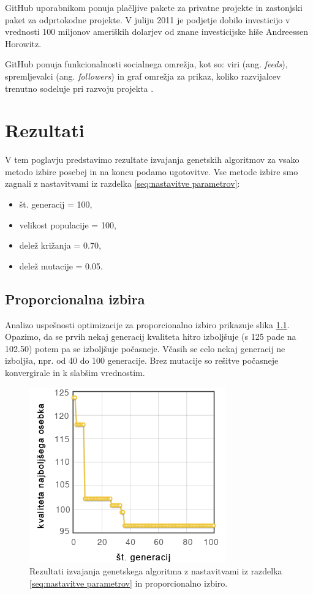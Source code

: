 \documentclass[a4paper, 12pt]{book}
\begin{document}
GitHub uporabnikom ponuja pla\v cljive pakete za privatne projekte in zastonjski paket za odprtokodne projekte. V juliju 2011 je podjetje dobilo investicijo v vrednosti 100 miljonov ameri\v skih dolarjev od znane investicijske hi\v se Andreessen Horowitz.

GitHub ponuja funkcionalnosti socialnega omre\v zja, kot so: viri (ang. \textit{feeds}), spremljevalci (ang. \textit{followers}) in graf omre\v zja za prikaz, koliko razvijalcev trenutno sodeluje pri razvoju projekta
\cite{wikipedia-github}.

\chapter{Rezultati}
\label{ch4}

V tem poglavju predstavimo rezultate izvajanja genetskih algoritmov za vsako metodo izbire posebej in na koncu podamo ugotovitve. Vse metode izbire smo zagnali z nastavitvami iz razdelka \ref{seq:nastavitve parametrov}:

\begin{itemize}
\item \v st. generacij = 100,
\item velikost populacije = 100,
\item dele\v z kri\v zanja = 0.70,
\item dele\v z mutacije = 0.05.
\end{itemize}

\section{Proporcionalna izbira}

Analizo uspe\v snosti optimizacije za proporcionalno izbiro prikazuje slika \ref{res:proporcionalna izbira}. Opazimo, da se prvih nekaj generacij kvaliteta hitro izbolj\v suje (s 125 pade na 102.50) potem pa se izbolj\v suje po\v casneje. V\v casih se celo nekaj generacij ne izbolj\v sa, npr. od 40 do 100 generacije. Brez mutacije so re\v sitve po\v casneje konvergirale in k slab\v sim vrednostim.

\begin{figure}
\centering
\includegraphics[scale=0.70]{prop_izbira.png}
\caption{Rezultati izvajanja genetskega algoritma z nastavitvami iz razdelka \ref{seq:nastavitve parametrov} in proporcionalno izbiro.}
\label{res:proporcionalna izbira}
\end{figure}
\end{document}
